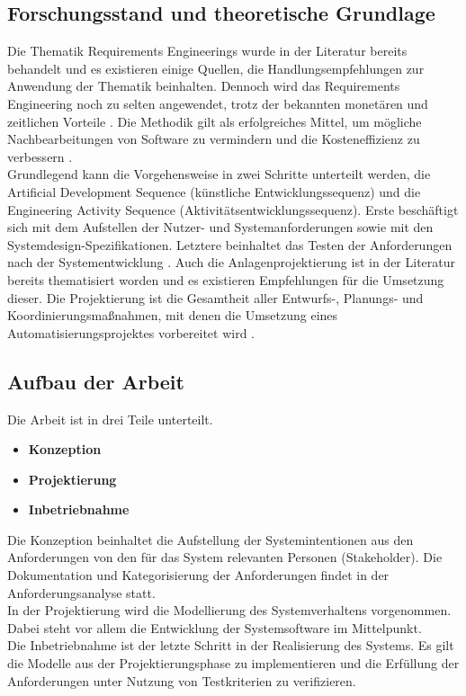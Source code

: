 \documentclass[../../Bachelorarbeit.tex]{subfiles}
\begin{document}
\subsection{Forschungsstand und theoretische Grundlage}
Die Thematik Requirements Engineerings wurde in der Literatur bereits behandelt und es existieren einige Quellen, die Handlungsempfehlungen zur Anwendung der Thematik beinhalten. Dennoch wird das Requirements Engineering noch zu selten angewendet, trotz der bekannten monetären und zeitlichen Vorteile \cite[xvii]{Laplante2014}. Die Methodik gilt als erfolgreiches Mittel, um mögliche Nachbearbeitungen von Software zu vermindern und die Kosteneffizienz zu verbessern \cite[1]{
Laplante2014}.\\
Grundlegend kann die Vorgehensweise in zwei Schritte unterteilt werden, die \glqq Artificial Development Sequence\grqq{} (künstliche Entwicklungssequenz) und die \glqq Engineering Activity Sequence\grqq{} (Aktivitätsentwicklungssequenz). Erste beschäftigt sich mit dem Aufstellen der Nutzer- und Systemanforderungen sowie mit den Systemdesign-Spezifikationen. Letztere beinhaltet das Testen der Anforderungen nach der Systementwicklung \cite[6]{
Laplante2014}.
Auch die Anlagenprojektierung ist in der Literatur bereits thematisiert worden und es existieren Empfehlungen für die Umsetzung dieser. Die Projektierung ist die Gesamtheit aller Entwurfs-, Planungs- und Koordinierungsmaßnahmen, mit denen die Umsetzung eines Automatisierungsprojektes vorbereitet wird \cite[8]{Bindel2017}.\\

\subsection{Aufbau der Arbeit}
Die Arbeit ist in drei Teile unterteilt.

\begin{itemize}
    \item \textbf{Konzeption}
    \item \textbf{Projektierung}
    \item \textbf{Inbetriebnahme}
\end{itemize}

Die Konzeption beinhaltet die Aufstellung der Systemintentionen aus den Anforderungen von den für das System relevanten Personen (Stakeholder). Die Dokumentation und Kategorisierung der Anforderungen findet in der Anforderungsanalyse statt.\\
In der Projektierung wird die Modellierung des Systemverhaltens vorgenommen. Dabei steht vor allem die Entwicklung der Systemsoftware im Mittelpunkt.\\
Die Inbetriebnahme ist der letzte Schritt in der Realisierung des Systems. Es gilt die Modelle aus der Projektierungsphase zu implementieren und die Erfüllung der Anforderungen unter Nutzung von Testkriterien zu verifizieren.\\
\end{document}
